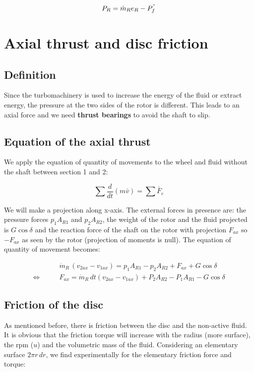 \begin{equation}
P_R = \dot{m}_R e_R - P^"_f
\end{equation}


\section{Axial thrust and disc friction}
\subsection{Definition}
Since the turbomachinery is used to increase the energy of the fluid or extract energy, the pressure at the two sides of the rotor is different. This leads to an axial force and we need \textbf{thrust bearings} to avoid the shaft to slip. 

\subsection{Equation of the axial thrust}
We apply the equation of quantity of movements to the wheel and fluid without the shaft between section 1 and 2: 

\begin{equation}
\sum \frac{d}{dt}(m\bar{v}) = \sum \bar{F}_e
\end{equation}

We will make a projection along x-axis. The external forces in presence are: the pressure forces $p_1A_{R1}$ and $p_2A_{R2}$, the weight of the rotor and the fluid projected is $G\cos \delta$ and the reaction force of the shaft on the rotor with projection $F_{ax}$ so $-F_{ax}$ as seen by the rotor (projection of moments is null). The equation of quantity of movement becomes: 

\begin{equation}
\begin{aligned}
&\dot{m}_R\, (v_{2ax} - v_{1ax}) = p_1 A_{R1} - p_2 A_{R2} + F_{ax} + G\cos \delta \\
\Leftrightarrow\qquad &F_{ax} = \dot{m}_R\, dt (v_{2ax} - v_{1ax}) + P_2 A_{R2} - P_1 A_{R1} -  G\cos \delta
\end{aligned}
\end{equation}

\subsection{Friction of the disc}
As mentioned before, there is friction between the disc and the non-active fluid. It is obvious that the friction torque will increase with the radius (more surface), the rpm ($u$) and the volumetric mass of the fluid. Considering an elementary surface $2\pi r\, dr$, we find experimentally for the elementary friction force and torque: 

